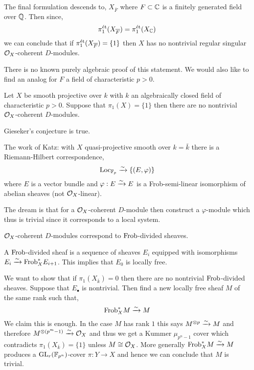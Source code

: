 \documentclass[12pt]{article}
\begin{document}
The final formulation descends to,
$X_{\overline{F}}$ where $F \subset \mathbb{C}$ is a finitely generated field over $\mathbb{Q}$. Then since,
\[ \pi_1^{\text{\'{e}t}}(X_{\overline{F}}) = \pi_1^{\text{\'{e}t}}(X_{\mathbb{C}}) \]
we can conclude that if $\pi_1^{\text{\'{e}t}}(X_{\overline{F}}) = \{ 1 \}$ then $X$ has no nontrivial regular singular $\mathcal{O}_{X}$-coherent $D$-modules.

\begin{rmk}
There is no known purely algebraic proof of this statement. We would also like to find an analog for $F$ a field of characteristic $p > 0$. 
\end{rmk}

\begin{conj}[Gieseker, 1975]
Let $X$ be smooth projective over $k$ with $k$ an algebraically closed field of characteristic $p > 0$. Suppose that $\pi_1(X) = \{ 1 \}$ then there are no nontrivial $\mathcal{O}_{X}$-coherent $D$-modules. 
\end{conj}

\begin{theorem}[E-Mehta, 2010]
Gieseker's conjecture is true. 
\end{theorem}

\begin{rmk}
The work of Katz: with $X$ quasi-projective smooth over $k = \bar{k}$ there is a Riemann-Hilbert correspondence,
\[ \mathrm{Loc}_{\mathbb{F}_p} \xrightarrow{\sim} \{ (E, \varphi) \} \]
where $E$ is a vector bundle and $\varphi : E \xrightarrow{\sim} E$ is a Frob-semi-linear isomorphism of abelian sheaves (not $\mathcal{O}_{X}$-linear). 
\end{rmk}

\begin{rmk}
The dream is that for a $\mathcal{O}_{X}$-coherent $D$-module then construct a $\varphi$-module which thus is trivial since it corresponds to a local system. 
\end{rmk}

\begin{prop}
$\mathcal{O}_{X}$-coherent $D$-modules correspond to $\mathrm{Frob}$-divided sheaves.
\end{prop}

\begin{rmk}
A $\mathrm{Frob}$-divided sheaf is a sequence of sheaves $E_i$ equipped with isomorphisms $E_i \xrightarrow{\sim} \mathrm{Frob}^*_X E_{i+1}$. This implies that $E_0$ is locally free. 
\end{rmk}

\begin{rmk}
We want to show that if $\pi_1(X_{\overline{k}}) = 0$ then there are no nontrivial $\mathrm{Frob}$-divided sheaves. Suppose that $E_\bullet$ is nontrivial. Then find a new locally free sheaf $M$ of the same rank such that,
\[ \mathrm{Frob}_X^* M \xrightarrow{\sim} M \]
We claim this is enough. In the case $M$ has rank $1$ this says $M^{\otimes p} \xrightarrow{\sim} M$ and therefore $M^{\otimes (p^m - 1)} \xrightarrow{\sim} \mathcal{O}_{X}$ and thus we get a Kummer $\mu_{p^{n}-1}$ cover which contradicts $\pi_1(X_{\overline{k}}) = \{ 1 \}$ unless $M \cong \mathcal{O}_{X}$. More generally $\mathrm{Frob}_X^* M \xrightarrow{\sim} M$ produces a $\mathrm{GL}_r(\mathbb{F}_{p^n})$-cover $\pi : Y \to X$ and hence we can conclude that $M$ is trivial.
\end{rmk}
\end{document}
